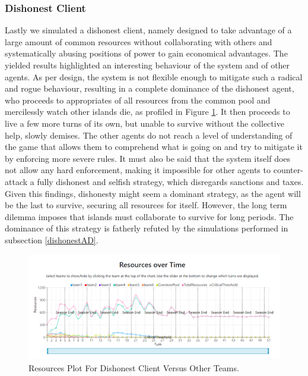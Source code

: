 \subsubsection{Dishonest Client}
Lastly we simulated a dishonest client, namely designed to take advantage of a large amount of common resources without collaborating with others and systematically abusing positions of power to gain economical advantages. The yielded results highlighted an interesting behaviour of the system and of other agents. As per design, the system is not flexible enough to mitigate such a radical and rogue behaviour, resulting in a complete dominance of the dishonest agent, who proceeds to appropriates of all resources from the common pool and mercilessly watch other islands die, as profiled in Figure \ref{fig:ResourcesDO}. It then proceeds to live a few more turns of its own, but unable to survive without the collective help, slowly demises. The other agents do not reach a level of understanding of the game that allows them to comprehend what is going on and try to mitigate it by enforcing more severe rules. It must also be said that the system itself does not allow any hard enforcement, making it impossible for other agents to counter-attack a fully dishonest and selfish strategy, which disregards sanctions and taxes. Given this findings, dishonesty might seem a dominant strategy, as the agent will be the last to survive, securing all resources for itself. However, the long term dilemma imposes that islands must collaborate to survive for long periods. The dominance of this strategy is fatherly refuted by the simulations performed in subsection \ref{dishonestAD}.

\begin{figure}[H]
\centering
\includegraphics[scale=0.8]{12_team4_agentdesign/images/ResourcesDO.png}
\caption{Resources Plot For Dishonest Client Versus Other Teams.}
\label{fig:ResourcesDO}
\end{figure}

